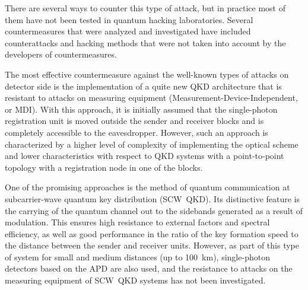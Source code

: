 There are several ways to counter this type of attack, but in practice most of them have not been tested in quantum hacking laboratories. Several countermeasures that were analyzed and investigated have included counterattacks and hacking methods that were not taken into account by the developers of countermeasures.
	
The most effective countermeasure against the well-known types of attacks on detector side is the implementation of a  quite new QKD architecture that is resistant to attacks on measuring equipment (Measurement-Device-Independent, or MDI). With this approach, it is initially assumed that the single-photon registration unit is moved outside the sender and receiver blocks and is completely accessible to the eavesdropper. However, such an approach is characterized by a higher level of complexity of implementing the optical scheme and lower characteristics with respect to QKD systems with a point-to-point topology with a registration node in one of the blocks.
	
One of the promising approaches is the method of quantum communication at subcarrier-wave quantum key distribution (SCW~QKD). Its distinctive feature is the carrying of the quantum channel out to the sidebands generated as a result of modulation. This ensures high resistance to external factors and spectral efficiency, as well as good performance in the ratio of the key formation speed to the distance between the sender and receiver units. However, as part of this type of system for small and medium distances (up to 100~km), single-photon detectors based on the APD are also used, and the resistance to attacks on the measuring equipment of SCW~QKD systems has not been investigated.
	
